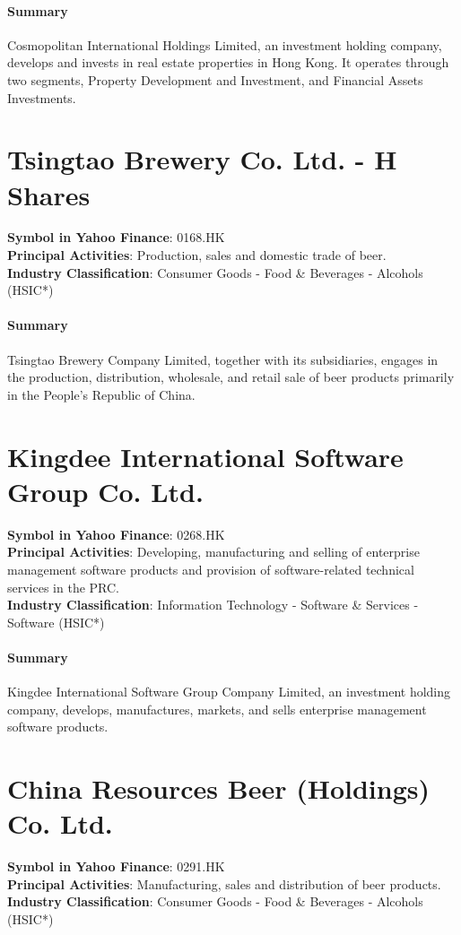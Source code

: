 \paragraph{Summary}
Cosmopolitan International Holdings Limited, an investment holding company, develops and invests in real estate properties in Hong Kong. It operates through two segments, Property Development and Investment, and Financial Assets Investments.


\section{Tsingtao Brewery Co. Ltd. - H Shares}
\textbf{Symbol in Yahoo Finance}: 0168.HK\\
\textbf{Principal Activities}: Production, sales and domestic trade of beer.\\
\textbf{Industry Classification}: Consumer Goods - Food \& Beverages - Alcohols (HSIC*)
\paragraph{Summary}
Tsingtao Brewery Company Limited, together with its subsidiaries, engages in the production, distribution, wholesale, and retail sale of beer products primarily in the People's Republic of China.


\section{Kingdee International Software Group Co. Ltd.}
\textbf{Symbol in Yahoo Finance}: 0268.HK\\
\textbf{Principal Activities}: Developing, manufacturing and selling of enterprise management software products and provision of software-related technical services in the PRC.\\
\textbf{Industry Classification}: Information Technology - Software \& Services - Software (HSIC*)
\paragraph{Summary}
Kingdee International Software Group Company Limited, an investment holding company, develops, manufactures, markets, and sells enterprise management software products.


\section{China Resources Beer (Holdings) Co. Ltd.}
\textbf{Symbol in Yahoo Finance}: 0291.HK\\
\textbf{Principal Activities}: Manufacturing, sales and distribution of beer products.\\
\textbf{Industry Classification}: Consumer Goods - Food \& Beverages - Alcohols (HSIC*)
